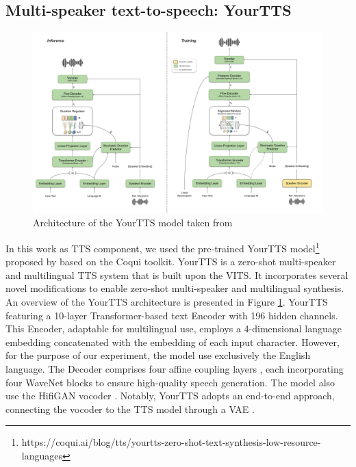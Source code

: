 \subsection{Multi-speaker text-to-speech: YourTTS}

\begin{figure}
    \begin{center}
        \includegraphics[scale=0.4]{imgs/YourTTS.png}
        \caption{Architecture of the YourTTS model taken from \cite{casanova2022yourtts}}
        \label{fig:YourTTS}
    \end{center}
\end{figure}

In this work as \ac{TTS} component, we used the pre-trained YourTTS model\footnote{https://coqui.ai/blog/tts/yourtts-zero-shot-text-synthesis-low-resource-languages} proposed by \cite{casanova2022yourtts} based on the  Coqui toolkit. YourTTS is a zero-shot multi-speaker and multilingual \ac{TTS} system that is built upon the \ac{VITS}. It incorporates several novel modifications to enable zero-shot multi-speaker and multilingual synthesis. An overview of the YourTTS architecture is presented in Figure \ref{fig:YourTTS}.
YourTTS featuring a 10-layer Transformer-based text Encoder with 196 hidden channels. This Encoder, adaptable for multilingual use, employs a 4-dimensional language embedding concatenated with the embedding of each input character. However, for the purpose of our experiment, the model use exclusively the English language. The Decoder comprises four affine coupling layers \cite{45819}, each incorporating four WaveNet blocks \cite{45774} to ensure high-quality speech generation. The model also use the HifiGAN vocoder \cite{kong2020hifi}. Notably, YourTTS adopts an end-to-end approach, connecting the vocoder to the \ac{TTS} model through a \ac{VAE} \cite{VAE}.

